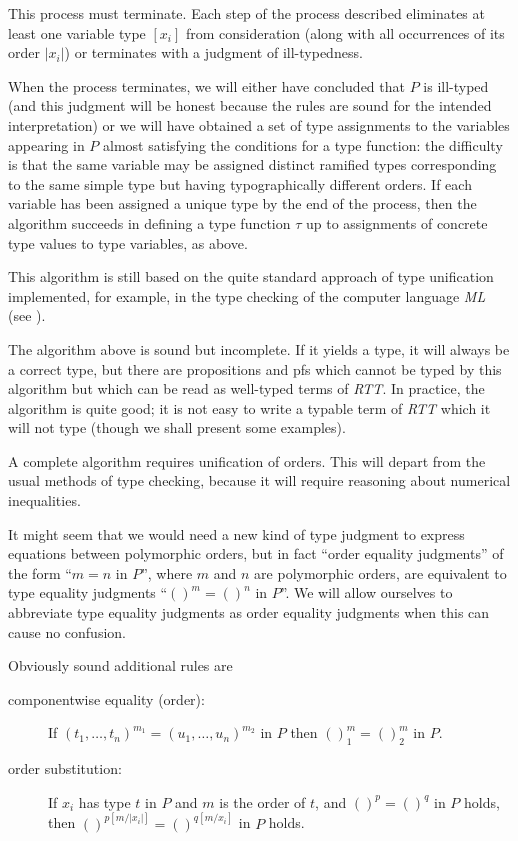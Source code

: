 \documentclass{article}
\begin{document}
\begin{description}
This process must terminate.  Each step of the process described
eliminates at least one variable type $[x_i]$ from consideration
(along with all occurrences of its order $|x_i|$) or terminates with
a judgment of ill-typedness.

When the process terminates, we will either have concluded that $P$ is
ill-typed (and this judgment will be honest because the rules are
sound for the intended interpretation) or we will have obtained a set
of type assignments to the variables appearing in $P$ almost
satisfying the conditions for a type function: the difficulty is that
the same variable may be assigned distinct ramified types
corresponding to the same simple type but having typographically
different orders.  If each variable has been assigned a unique type by
the end of the process, then the algorithm succeeds in defining a type
function $\tau$ up to assignments of concrete type values to type
variables, as above.

This algorithm is still based on the quite standard approach of type
unification implemented, for example, in the type checking of the
computer language {\em ML\/} (see \cite{unification}).

\end{description}

The algorithm above is sound but incomplete.  If it yields a type, it
will always be a correct type, but there are propositions and pfs
which cannot be typed by this algorithm but which can be read as
well-typed terms of {\em RTT\/}.  In practice, the algorithm is quite
good; it is not easy to write a typable term of {\em RTT\/} which it
will not type (though we shall present some examples).

A complete algorithm requires unification of orders.  This will depart
from the usual methods of type checking, because it will require
reasoning about numerical inequalities.

It might seem that we would need a new kind of type judgment to
express equations between polymorphic orders, but in fact ``order
equality judgments'' of the form ``$m=n$ in $P$'', where $m$ and $n$
are polymorphic orders, are equivalent to type equality judgments
``$()^m = ()^n$ in $P$''.  We will allow ourselves to abbreviate type
equality judgments as order equality judgments when this can cause no
confusion.

Obviously sound additional rules are

\begin{description}

\item[componentwise equality (order):] If
$(t_1,\ldots,t_n)^{m_1} = (u_1,\ldots,u_n)^{m_2}$ in $P$ then
$()^m_1=()^m_2$ in $P$.  

\item[order substitution:] If $x_i$ has type $t$ in $P$ and $m$ is the
order of $t$, and $()^p=()^q$ in $P$ holds, then
$()^{p[m/|x_i|]}=()^{q[m/x_i]}$ in $P$ holds.

\end{description}
\end{document}

